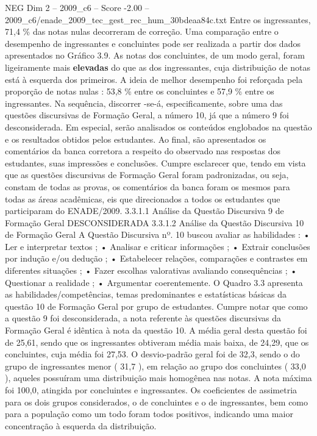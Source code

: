 \begin{textsample}{NEG Dim 2 – 2009\_c6 – Score -2.00 – 2009\_c6/enade\_2009\_tec\_gest\_rec\_hum\_30bdeaa84c.txt}
Entre os ingressantes, 71,4 \% das notas nulas decorreram de correção.
Uma comparação entre o desempenho de ingressantes e concluintes pode ser realizada a partir dos dados apresentados no Gráfico 3.9.
As notas dos concluintes, de um modo geral, foram ligeiramente mais \textbf{elevadas} do que as dos ingressantes, cuja distribuição de notas está à esquerda dos primeiros.
A ideia de melhor desempenho foi reforçada pela proporção de notas nulas : 53,8 \% entre os concluintes e 57,9 \% entre os ingressantes.
Na sequência, discorrer -se-á, especificamente, sobre uma das questões discursivas de Formação Geral, a número 10, já que a número 9 foi desconsiderada.
Em especial, serão analisados os conteúdos englobados na questão e os resultados obtidos pelos estudantes.
Ao final, são apresentados os comentários da banca corretora a respeito do observado nas respostas dos estudantes, suas impressões e conclusões.
Cumpre esclarecer que, tendo em vista que as questões discursivas de Formação Geral foram padronizadas, ou seja, constam de todas as provas, os comentários da banca foram os mesmos para todas as áreas acadêmicas, eis que direcionados a todos os estudantes que participaram do ENADE/2009. 3.3.1.1 Análise da Questão Discursiva 9 de Formação Geral DESCONSIDERADA 3.3.1.2 Análise da Questão Discursiva 10 de Formação Geral A Questão Discursiva nº. 10 buscou avaliar as habilidades : • Ler e interpretar textos ; • Analisar e criticar informações ; • Extrair conclusões por indução e/ou dedução ; • Estabelecer relações, comparações e contrastes em diferentes situações ; • Fazer escolhas valorativas avaliando consequências ; • Questionar a realidade ; • Argumentar coerentemente.
O Quadro 3.3 apresenta as habilidades/competências, temas predominantes e estatísticas básicas da questão 10 de Formação Geral por grupo de estudantes.
Cumpre notar que como a questão 9 foi desconsiderada, a nota referente às questões discursivas da Formação Geral é idêntica à nota da questão 10.
A média geral desta questão foi de 25,61, sendo que os ingressantes obtiveram média mais baixa, de 24,29, que os concluintes, cuja média foi 27,53.
O desvio-padrão geral foi de 32,3, sendo o do grupo de ingressantes menor ( 31,7 ), em relação ao grupo dos concluintes ( 33,0 ), aqueles possuíram uma distribuição mais homogênea nas notas.
A nota máxima foi 100,0, atingida por concluintes e ingressantes.
Os coeficientes de assimetria para os dois grupos considerados, o de concluintes e o de ingressantes, bem como para a população como um todo foram todos positivos, indicando uma maior concentração à esquerda da distribuição.

\end{textsample}
